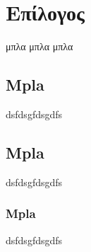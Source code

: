 \chapter{Επίλογος}
μπλα μπλα μπλα

\section{Mpla}
dsfdsgfdsgdfs

\section{Mpla}
dsfdsgfdsgdfs
\subsection{Mpla}
dsfdsgfdsgdfs



